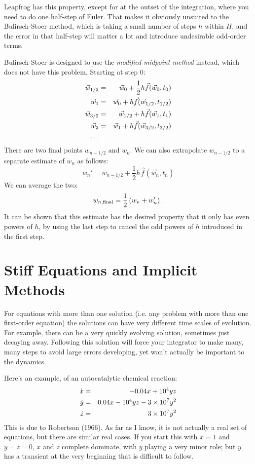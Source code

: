 Leapfrog has this property, except for at the outset of the
integration, where you need to do one half-step of Euler. That makes
it obviously unsuited to the Bulirsch-Stoer method, which is taking a
small number of steps $h$ within $H$, and the error in that half-step
will matter a lot and introduce undesirable odd-order terms.

Bulirsch-Stoer is designed to use the {\it modified midpoint method}
instead, which does not have this problem. Starting at step $0$:
\begin{eqnarray}
\vec{w}_{1/2} &=& \vec{w}_{0} + \frac{1}{2} h \vec{f}(\vec{w}_0, t_0) \cr
\vec{w}_{1} &=& \vec{w}_{0} + h \vec{f}(\vec{w}_{1/2}, t_{1/2}) \cr
\vec{w}_{3/2} &=& \vec{w}_{1/2} + h \vec{f}(\vec{w}_{1}, t_{1}) \cr
\vec{w}_{2} &=& \vec{w}_{1} + h \vec{f}(\vec{w}_{3/2}, t_{3/2}) \cr
\ldots
\end{eqnarray}
There are two final points $w_{n-1/2}$ and $w_{n}$. We can also extrapolate
$w_{n-1/2}$ to a separate estimate of $w_n$ as follows:
\begin{equation}
w_n' = w_{n-1/2} + \frac{1}{2} h \vec{f}(\vec{w}_{n}, t_{n})
\end{equation}
We can average the two:
\begin{equation}
w_{n, {\rm final}} = \frac{1}{2}\left(w_n + w_n'\right).
\end{equation}
It can be shown that this estimate has the desired property that it
only has even powers of $h$, by using the last step to cancel the odd
powers of $h$ introduced in the first step.

\section{Stiff Equations and Implicit Methods}

For equations with more than one solution (i.e. any problem with more
than one first-order equation) the solutions can have very different
time scales of evolution. For example, there can be a very quickly
evolving solution, sometimes just decaying away. Following this
solution will force your integrator to make many, many steps to avoid
large errors developing, yet won't actually be important to the
dynamics. 

Here's an example, of an autocatalytic chemical reaction:
\begin{eqnarray}
{\dot x} &=& - 0.04 x + 10^4 y z \cr
{\dot y} &=& 0.04 x - 10^4 y z - 3\times 10^7 y^2 \cr
{\dot z} &=& 3\times 10^7 y^2 
\end{eqnarray}
This is due to Robertson (1966). As far as I know, it is not actually
a real set of equations, but there are similar real cases. If you
start this with $x=1$ and $y=z=0$, $x$ and $z$ complete dominate, with
$y$ playing a very minor role; but $y$ has a transient at the very
beginning that is difficult to follow.

